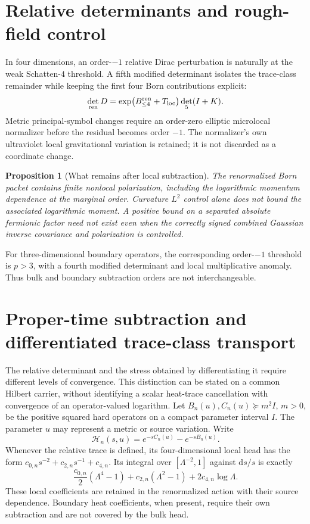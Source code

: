 \documentclass[11pt,a4paper,oneside]{book}
\theoremstyle{plain}
\newtheorem{proposition}[theorem]{Proposition}
\theoremstyle{definition}
\theoremstyle{remark}
\newcommand{\dd}{\mathrm d}
\newcommand{\src}[2]{\cite{#1}}
\begin{document}
\section{Relative determinants and rough-field control}
In four dimensions, an order-$-1$ relative Dirac perturbation is naturally at the weak Schatten-$4$ threshold. A fifth modified determinant isolates the trace-class remainder while keeping the first four Born contributions explicit:
\begin{equation}
 \det_{\rm ren}D
 =\exp\bigl(B_{\le4}^{\rm ren}+T_{\rm loc}\bigr)\det_5(I+K).
 \label{eq:det5}
\end{equation}
Metric principal-symbol changes require an order-zero elliptic microlocal normalizer before the residual becomes order $-1$. The normalizer's own ultraviolet local gravitational variation is retained; it is not discarded as a coordinate change. \src{R4}{thm:v4v91-decomp}

\begin{proposition}[What remains after local subtraction]
The renormalized Born packet contains finite nonlocal polarization, including the logarithmic momentum dependence at the marginal order. Curvature $L^2$ control alone does not bound the associated logarithmic moment. A positive bound on a separated absolute fermionic factor need not exist even when the correctly signed combined Gaussian inverse covariance and polarization is controlled.
\end{proposition}
\cite{R3,R4}
For three-dimensional boundary operators, the corresponding order-$-1$ threshold is $p>3$, with a fourth modified determinant and local multiplicative anomaly. Thus bulk and boundary subtraction orders are not interchangeable.

\section{Proper-time subtraction and differentiated trace-class transport}
\label{sec:proper-time-transfer}
The relative determinant and the stress obtained by differentiating it
require different levels of convergence.  This distinction can be stated
on a common Hilbert carrier, without identifying a scalar heat-trace
cancellation with convergence of an operator-valued logarithm.
Let $B_n(u),C_n(u)\succeq m^2 I$, $m>0$, be the positive squared hard
operators on a compact parameter interval $I$.  The parameter $u$ may
represent a metric or source variation.  Write
\[
 \mathcal H_n(s,u)=e^{-sC_n(u)}-e^{-sB_n(u)}.
\]
Whenever the relative trace is defined, its four-dimensional local head
has the form $c_{0,n}s^{-2}+c_{2,n}s^{-1}+c_{4,n}$.  Its integral over
$[\Lambda^{-2},1]$ against $\dd s/s$ is exactly
\begin{equation}
 \frac{c_{0,n}}2(\Lambda^4-1)
 +c_{2,n}(\Lambda^2-1)+2c_{4,n}\log\Lambda.
 \label{eq:proper-time-head}
\end{equation}
These local coefficients are retained in the renormalized action with
their source dependence.  Boundary heat coefficients, when present,
require their own subtraction and are not covered by the bulk head.
\end{document}
